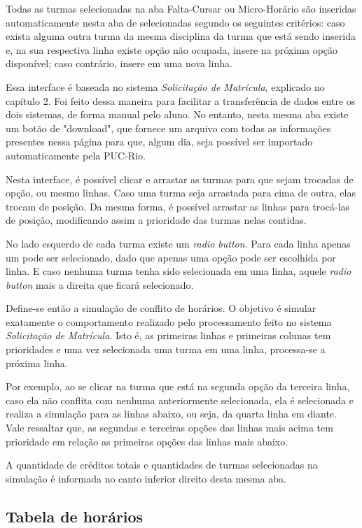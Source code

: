 \documentclass[graduacao,brazil]{ThesisPUC}
\begin{document}
Todas as turmas selecionadas na aba Falta-Cursar ou Micro-Horário são inseridas automaticamente nesta aba de selecionadas segundo os seguintes critérios: caso exista alguma outra turma da mesma disciplina da turma que está sendo inserida e, na sua respectiva linha existe opção não ocupada, insere na próxima opção disponível; caso contrário, insere em uma nova linha.  

Essa interface é baseada no sistema \textit{Solicitação de Matrícula}, explicado no capítulo 2. Foi feito dessa maneira para facilitar a transferência de dados entre os dois sistemas, de forma manual pelo aluno. No entanto, nesta mesma aba existe um botão de "download", que fornece um arquivo com todas as informações presentes nessa página para que, algum dia, seja possível ser importado automaticamente pela PUC-Rio. 

Nesta interface, é possível clicar e arrastar as turmas para que sejam trocadas de opção, ou mesmo linhas. Caso uma turma seja arrastada para cima de outra, elas trocam de posição. Da mesma forma, é possível arrastar as linhas para trocá-las de posição, modificando assim a prioridade das turmas nelas contidas. 

No lado esquerdo de cada turma existe um \textit{radio button}. Para cada linha apenas um pode ser selecionado, dado que apenas uma opção pode ser escolhida por linha. E caso nenhuma turma tenha sido selecionada em uma linha, aquele \textit{radio button} mais a direita que ficará selecionado.  

Define-se então a simulação de conflito de horários. O objetivo é simular exatamente o comportamento realizado pelo processamento feito no sistema \textit{Solicitação de Matrícula}. Isto é, as primeiras linhas e primeiras colunas tem prioridades e uma vez selecionada uma turma em uma linha, processa-se a próxima linha. 

Por exemplo, ao se clicar na turma que está na segunda opção da terceira linha, caso ela não conflita com nenhuma anteriormente selecionada, ela é selecionada e realiza a simulação para as linhas abaixo, ou seja, da quarta linha em diante. Vale ressaltar que, as segundas e terceiras opções das linhas mais acima tem prioridade em relação as primeiras opções das linhas mais abaixo. 

A quantidade de créditos totais e quantidades de turmas selecionadas na simulação é informada no canto inferior direito desta mesma aba. 

\subsection{Tabela de horários}
\end{document}
